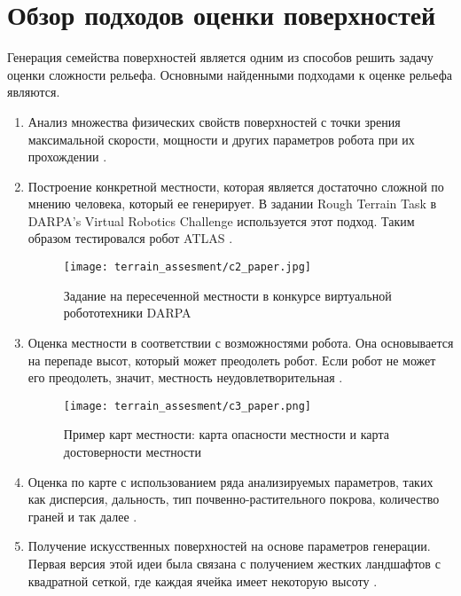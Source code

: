 \section{Обзор подходов оценки поверхностей}Генерация семейства поверхностей является одним из способов решить задачу оценки сложности рельефа. Основными найденными подходами к оценке рельефа являются.
\begin{enumerate} 
    \item Анализ множества физических свойств поверхностей с точки зрения максимальной скорости, мощности и других параметров робота при их прохождении \cite{Altendorfer2001}.
    \item Построение конкретной местности, которая является достаточно сложной по мнению человека, который ее генерирует. В задании Rough Terrain Task в DARPA's Virtual Robotics Challenge используется этот подход. Таким образом тестировался робот ATLAS \cite{feng_Optimizationbased_2015} .
          
          \begin{figure}[H]
              \centering\texttt{[image: terrain\_assesment/c2\_paper.jpg]}
              \caption{Задание на пересеченной местности в конкурсе виртуальной робототехники DARPA}
              \label{fig:terrain_assesment/c2_paper.jpg}
          \end{figure}
          
    \item Оценка местности в соответствии с возможностями робота. Она основывается на перепаде высот, который может преодолеть робот. Если робот не может его преодолеть, значит, местность неудовлетворительная \cite{hung_Advanced_2004,Howard2000} .
          
          \begin{figure}[H]
              \centering\texttt{[image: terrain\_assesment/c3\_paper.png]}
              \caption{Пример карт местности: карта опасности местности и карта достоверности местности}
              \label{fig:terrain_assesment/c3_paper.png}
          \end{figure}

    \item Оценка по карте с использованием ряда анализируемых параметров, таких как дисперсия, дальность, тип почвенно-растительного покрова, количество граней и так далее \cite{hung_Advanced_2004}.
    \item Получение искусственных поверхностей на основе параметров генерации. Первая версия этой идеи была связана с получением жестких ландшафтов с квадратной сеткой, где каждая ячейка имеет некоторую высоту \cite{sancho-pradel_Survey_2010} .
          

\end{enumerate}
